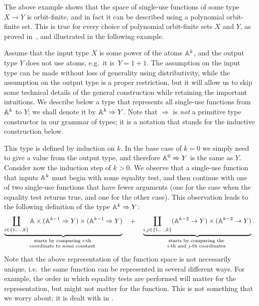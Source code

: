 \documentclass[a4paper,UKenglish,cleveref, autoref, numberwithinsect, thm-restate]{lipics-v2021}
\begin{document}
The above example shows that the space of single-use functions of some type $X \to Y$ is orbit-finite, and in fact it can be described using a polynomial orbit-finite set. This is true for every choice of polynomial orbit-finite sets $X$ and $Y$, as proved in~\cite[Theorem 5]{stefanski-phd}, and illustrated in the following example. 

\begin{example}\label{ex:decision-tree-types} Assume that the input type $X$ is some power of the atoms $\mathbb A^k$, and the output type $Y$ does not use atoms, e.g.~it is~$Y = 1 +1$. The assumption on the input type can be made without loss of generality using distributivity, while the assumption on the output type is a proper restriction, but it will allow us to skip some technical details of the general construction while retaining the important intuitions. 
We describe below a type that represents all single-use functions from $\mathbb A^k$ to $Y$; we shall denote it by $\mathbb A^k \Rightarrow Y$. Note that $\Rightarrow$ is \emph{not} a primitive type constructor in our grammar of types; it is a notation that stands for the inductive construction below.

This type is defined by  induction on $k$. In the base case of $k=0$ we simply need to give a value from the output type, and therefore $\mathbb A^0 \Rightarrow Y$ is the same as $Y$. Consider now the induction step of $k > 0$.  
    We observe that a single-use function that inputs $\mathbb A^k$ must begin with some equality test, and then continue with one of two single-use functions that have fewer arguments (one for the case when the equality test returns true, and one for the other case). This observation leads to the following definition of the type $\mathbb A^k \Rightarrow Y$:
\begin{align*}
\myunderbrace{ \coprod_{i \in \set{1,\ldots,k}} 
    \atoms \times (\atoms^{k-1} \Rightarrow Y) \times (\atoms^{k-1} \Rightarrow Y)
 }{starts by comparing $i$-th  \\
 coordinate to some constant}  \quad + \quad 
\myunderbrace{\coprod_{i, j \in \set{1,\ldots,k}} (\atoms^{k-2} \to Y) \times (\atoms^{k-2} \to Y)}{
    starts by comparing the \\ 
    $i$-th and $j$-th coordinates}.
\end{align*}
Note that the above representation of the function space is not necessarily unique, i.e.~the same function can be represented in several different ways. For example, the order in which equality tests are performed will matter for the representation, but might not matter for the function. This is not something that we worry about; it is dealt with in . \exampleend
\end{example}
\end{document}
